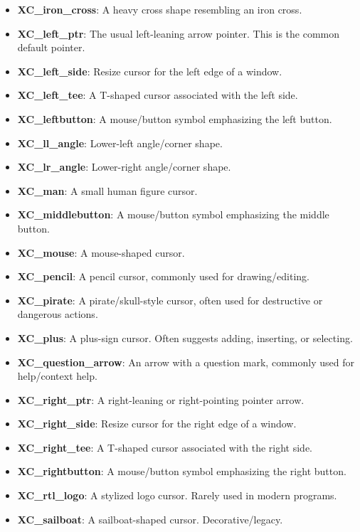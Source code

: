 \documentclass{report}
\begin{document}
\begin{itemize}
\begin{itemize}
                \item \textbf{XC\_iron\_cross}:	A heavy cross shape resembling an iron cross.
                \item \textbf{XC\_left\_ptr}:	The usual left-leaning arrow pointer. This is the common default pointer.
                \item \textbf{XC\_left\_side}:	Resize cursor for the left edge of a window.
                \item \textbf{XC\_left\_tee}:	A T-shaped cursor associated with the left side.
                \item \textbf{XC\_leftbutton}:	A mouse/button symbol emphasizing the left button.
                \item \textbf{XC\_ll\_angle}:	Lower-left angle/corner shape.
                \item \textbf{XC\_lr\_angle}:	Lower-right angle/corner shape.
                \item \textbf{XC\_man}:	A small human figure cursor.
                \item \textbf{XC\_middlebutton}:	A mouse/button symbol emphasizing the middle button.
                \item \textbf{XC\_mouse}:	A mouse-shaped cursor.
                \item \textbf{XC\_pencil}:	A pencil cursor, commonly used for drawing/editing.
                \item \textbf{XC\_pirate}:	A pirate/skull-style cursor, often used for destructive or dangerous actions.
                \item \textbf{XC\_plus}:	A plus-sign cursor. Often suggests adding, inserting, or selecting.
                \item \textbf{XC\_question\_arrow}:	An arrow with a question mark, commonly used for help/context help.
                \item \textbf{XC\_right\_ptr}:	A right-leaning or right-pointing pointer arrow.
                \item \textbf{XC\_right\_side}:	Resize cursor for the right edge of a window.
                \item \textbf{XC\_right\_tee}:	A T-shaped cursor associated with the right side.
                \item \textbf{XC\_rightbutton}:	A mouse/button symbol emphasizing the right button.
                \item \textbf{XC\_rtl\_logo}:	A stylized logo cursor. Rarely used in modern programs.
                \item \textbf{XC\_sailboat}:	A sailboat-shaped cursor. Decorative/legacy.

\end{itemize}
\end{itemize}
\end{document}
